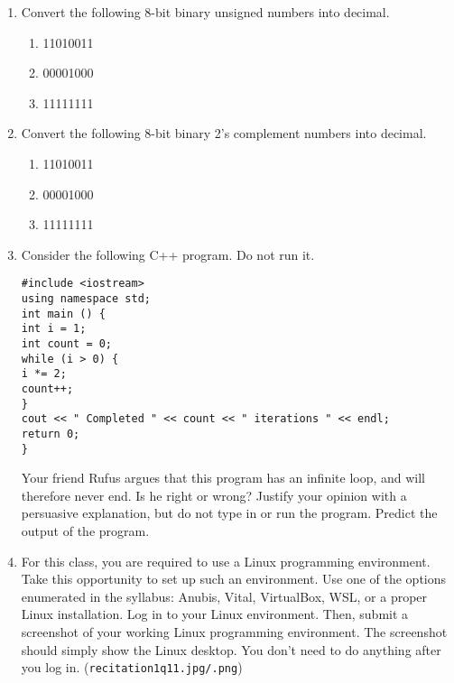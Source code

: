 \documentclass{article}
\begin{document}
\begin{enumerate}
    \item Convert the following 8-bit binary unsigned numbers into decimal.
    \begin{enumerate}
        \item 11010011
        \item 00001000
        \item 11111111
    \end{enumerate}

    \item Convert the following 8-bit binary 2’s complement numbers into decimal.
    \begin{enumerate}
        \item 11010011
        \item 00001000
        \item 11111111
    \end{enumerate}

    \item Consider the following C++ program. Do not run it.
    \begin{verbatim}
#include <iostream>
using namespace std;
int main () {
int i = 1;
int count = 0;
while (i > 0) {
i *= 2;
count++;
}
cout << " Completed " << count << " iterations " << endl;
return 0;
}
    \end{verbatim}
    Your friend Rufus argues that this program has an infinite loop, and will therefore never end. Is he right or wrong? Justify your opinion with a persuasive explanation, but do not type in or run the program. Predict the output of the program.

    \item For this class, you are required to use a Linux programming environment. Take this opportunity to set up such an environment. Use one of the options enumerated in the syllabus: Anubis, Vital, VirtualBox, WSL, or a proper Linux installation. Log in to your Linux environment. Then, submit a screenshot of your working Linux programming environment. The screenshot should simply show the Linux desktop. You don’t need to do anything after you log in. (\texttt{recitation1q11.jpg/.png})


\end{enumerate}
\end{document}
